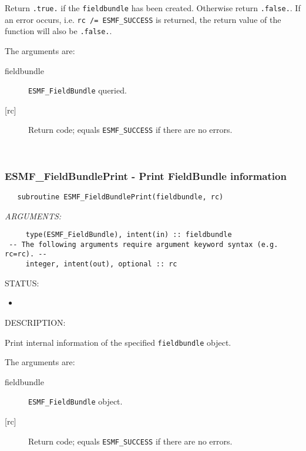    Return {\tt .true.} if the {\tt fieldbundle} has been created. Otherwise return
   {\tt .false.}. If an error occurs, i.e. {\tt rc /= ESMF\_SUCCESS} is
   returned, the return value of the function will also be {\tt .false.}.
  
   The arguments are:
   \begin{description}
   \item[fieldbundle]
   {\tt ESMF\_FieldBundle} queried.
   \item[{[rc]}]
   Return code; equals {\tt ESMF\_SUCCESS} if there are no errors.
   \end{description}
   
 
\mbox{}\hrulefill\ 
 
\subsubsection [ESMF\_FieldBundlePrint] {ESMF\_FieldBundlePrint - Print FieldBundle information}


\begin{verbatim}   subroutine ESMF_FieldBundlePrint(fieldbundle, rc)\end{verbatim}{\em ARGUMENTS:}
\begin{verbatim}     type(ESMF_FieldBundle), intent(in) :: fieldbundle
 -- The following arguments require argument keyword syntax (e.g. rc=rc). --
     integer, intent(out), optional :: rc\end{verbatim}
{\sf STATUS:}
   \begin{itemize}
   \item{}
   \end{itemize}
  
{\sf DESCRIPTION:\\ }


   Print internal information of the specified {\tt fieldbundle} object.
  
   The arguments are:
   \begin{description}
   \item[fieldbundle]
   {\tt ESMF\_FieldBundle} object.
   \item[{[rc]}]
   Return code; equals {\tt ESMF\_SUCCESS} if there are no errors.
   \end{description}
   
 
